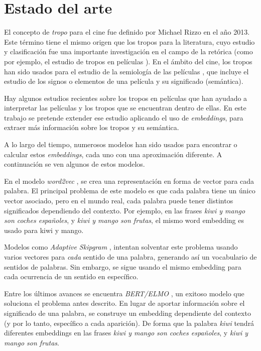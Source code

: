 \chapter{Estado del arte}

El concepto de \emph{tropo} para el cine fue definido por Michael Rizzo \cite{rizzo2013art} en el año 2013. Este término
tiene el mismo origen que los tropos para la literatura, cuyo estudio y clasificación fue una importante investigación en el
campo de la retórica (como por ejemplo, el estudio de tropos en películas \cite{nelson1998tropes}). En el ámbito del cine,
los tropos han sido usados para el estudio de la semiología de las películas \cite{howtoreadafilm}, que incluye el estudio
de los signos o elementos de una película y su significado (semántica).

Hay algunos estudios recientes sobre los tropos en películas \cite{garcia2018overview} que han ayudado a interpretar las
películas y los tropos que se encuentran dentro de ellas. En este trabajo se pretende extender ese estudio aplicando el uso
de \emph{embeddings}, para extraer más información sobre los tropos y su semántica.

A lo largo del tiempo, numerosos modelos han sido usados para encontrar o calcular estos \textit{embeddings}, cada uno
con una aproximación diferente. A continuación se ven algunos de estos modelos.

En el modelo \emph{word2vec} \cite{word2vec:1} \cite{word2vec:2}, se crea una representación
en forma de vector para cada palabra. El principal problema de este modelo es que cada palabra tiene un único vector asociado,
pero en el mundo real, cada palabra puede tener distintos significados dependiendo del contexto.
Por ejemplo, en las frases \emph{kiwi y mango son coches españoles}, y \emph{kiwi y mango son frutas},
el mismo word embedding es usado para kiwi y mango.

Modelos como \emph{Adaptive Skipgram} \cite{adaptiveskipgram}, intentan solventar este problema usando
varios vectores para \emph{cada} sentido de una palabra, generando así un vocabulario de sentidos de palabras.
Sin embargo, se sigue usando el mismo embedding para cada ocurrencia de un sentido en específico.

Entre los últimos avances se encuentra \emph{BERT/ELMO} \cite{bert}, un exitoso modelo que soluciona el
problema antes descrito. En lugar de aportar información sobre el significado de una palabra, se construye
un embedding dependiente del contexto (y por lo tanto, específico a cada aparición). De forma que la palabra
\emph{kiwi} tendrá diferentes embeddings en las frases \emph{kiwi y mango son coches españoles}, y
\emph{kiwi y mango son frutas}.

